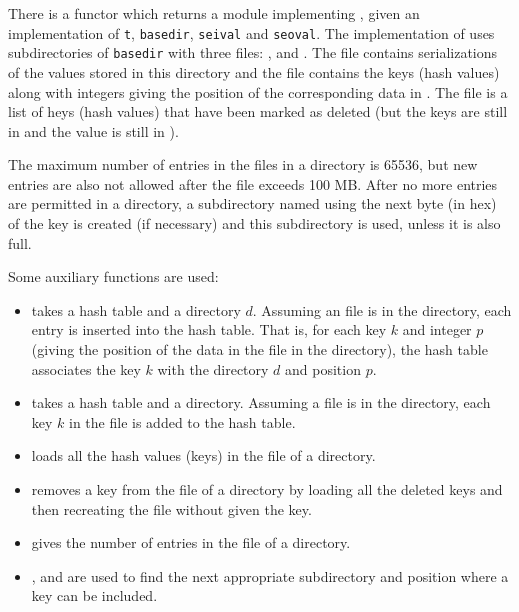 There is a functor {} which returns
a module implementing {}, given an implementation of {\tt{t}}, {\tt{basedir}}, {\tt{seival}} and {\tt{seoval}}.
The implementation of {}
uses subdirectories of {\tt{basedir}}
with three files: {},
{}
and {}.
The file {} contains serializations of the values stored in this directory
and the file {} contains the keys (hash values) along with integers giving
the position of the corresponding data in {}.
The file {} is a list of heys (hash values)
that have been marked as deleted (but the keys are still in {}
and the value is still in {}).

The maximum number of entries in the files in a directory is 65536,
but new entries are also not allowed after the {} file
exceeds 100 MB.
After no more entries are permitted in a directory,
a subdirectory named using the next byte (in hex) of the key is
created (if necessary) and this subdirectory is used, unless it is also full.

Some auxiliary functions are used:
\begin{itemize}
\item {} takes a hash table and a directory $d$.
Assuming an {} file is in the directory, each entry is inserted into the hash table.
That is, for each key $k$ and integer $p$ (giving the position of the data in the {} file
in the directory), the hash table associates the key $k$ with the directory $d$ and position $p$.
\item {} takes a hash table and a directory.
Assuming a {} file is in the directory, each key $k$ in the file is added to the hash table.
\item {} loads all the hash values (keys) in the {} file of a directory.
\item {} removes a key from the {} file of a directory
by loading all the deleted keys and then recreating the {} file without given the key.
\item {} gives the number of entries in the {} file of a directory.
\item {}, {} and {}
are used to find the next appropriate subdirectory and position where a key
can be included.
\end{itemize}


